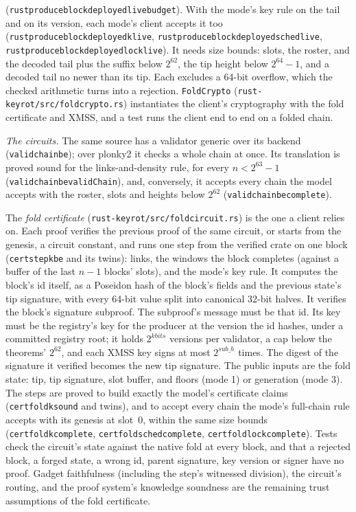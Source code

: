 \documentclass[10pt]{article}
\DeclareRobustCommand{\code}[1]{{\renewcommand{\_}{\textunderscore\allowbreak}\texttt{#1}}}
\begin{document}
(\code{rust\_produce\_block\_deployed\_live\_budget}). With the mode's
key rule on the tail and on its version, each mode's client accepts it
too (\code{rust\_produce\_block\_deployed\_k\_live},
\code{rust\_produce\_block\_deployed\_sched\_live},
\code{rust\_produce\_block\_deployed\_lock\_live}). It needs size
bounds: slots, the roster, and the decoded tail plus the suffix below
$2^{62}$, the tip height below $2^{64}-1$, and a decoded tail no newer than its tip. Each excludes a
64-bit overflow, which the checked arithmetic turns into a rejection.
\code{FoldCrypto} (\code{rust-keyrot/src/fold\_crypto.rs}) instantiates
the client's cryptography with the fold certificate and XMSS, and a
test runs the client end to end on a folded chain.

\emph{The circuits.} The same source has a validator generic over its
backend (\code{valid\_chain\_be}); over plonky2 it checks a whole chain
at once. Its translation is proved sound for the links-and-density rule,
for every $n < 2^{63} - 1$ (\code{valid\_chain\_be\_validChain}), and,
conversely, it accepts every chain the model accepts with the roster,
slots and heights below $2^{62}$ (\code{valid\_chain\_be\_complete}).

The \emph{fold certificate} (\code{rust-keyrot/src/fold\_circuit.rs}) is
the one a client relies on. Each proof verifies the previous proof of the
same circuit, or starts from the genesis, a circuit constant, and runs
one step from the verified crate on one block (\code{cert\_step\_k\_be}
and its twins): links, the windows the block completes (against a
buffer of the last $n-1$ blocks' slots), and the mode's key rule. It
computes the block's id itself, as a Poseidon hash of the block's fields
and the previous state's tip signature, with every 64-bit value split
into canonical 32-bit halves. It verifies the block's signature
subproof. The subproof's message must be that id. Its key must be the
registry's key for the producer at the version the id hashes, under a
committed registry root; it holds $2^{\mathit{kbits}}$ versions per
validator, a cap below the theorems' $2^{62}$, and each XMSS key signs
at most $2^{\mathit{sub\_h}}$ times. The digest of the signature it verified becomes
the new tip signature. The public inputs are the fold state: tip, tip
signature, slot buffer, and floors (mode 1) or generation (mode 3). The
steps are proved to build exactly the model's certificate claims
(\code{cert\_fold\_k\_sound} and twins), and to accept every chain the
mode's full-chain rule accepts with its genesis at slot~$0$, within the
same size bounds
(\code{cert\_fold\_k\_complete}, \code{cert\_fold\_sched\_complete},
\code{cert\_fold\_lock\_complete}). Tests check the circuit's state
against the native fold at every block, and that a rejected block, a
forged state, a wrong id, parent signature, key version or signer have
no proof. Gadget faithfulness (including the step's witnessed division),
the circuit's routing, and the proof system's knowledge soundness are
the remaining trust assumptions of the fold certificate.
\end{document}
